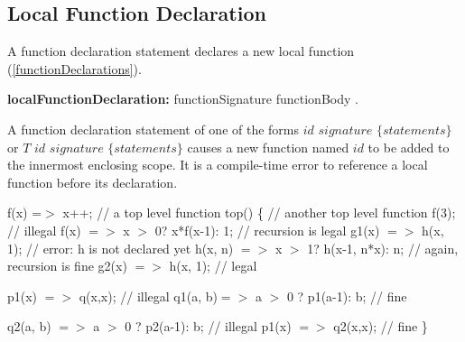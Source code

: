 \documentclass{article}
\begin{document}




\subsection{Local Function Declaration}

\LMHash{}
A function declaration statement declares a new local function (\ref{functionDeclarations}). 

 \begin{grammar}
{\bf localFunctionDeclaration:}
    functionSignature functionBody
  .
 \end{grammar}
 
\LMHash{}
A function declaration statement of one of the forms $id$ $signature$ $\{ statements \}$ or $T$ $id$ $signature$ $\{ statements \}$ causes a new function named $id$ to be added to the innermost enclosing scope. It is a compile-time error to reference a local function before its declaration. 



\begin{dartCode}
f(x) =$>$ x++;  // a top level function
top() \{ // another top level function
  f(3); // illegal
  f(x) $=>$ x $>$ 0? x*f(x-1): 1;  // recursion is legal
  g1(x) $=>$ h(x, 1); // error: h is not declared yet
  h(x, n) $=>$ x $>$ 1? h(x-1, n*x): n; // again, recursion is fine
  g2(x) $=>$ h(x, 1); // legal
  
  p1(x) $=>$ q(x,x); // illegal
  q1(a, b)$ =>$ a $>$ 0 ? p1(a-1): b; // fine

  q2(a, b) $=>$ a $>$ 0 ? p2(a-1): b; // illegal
  p1(x) $=>$ q2(x,x); // fine  
\}
\end{dartCode}
\end{document}
